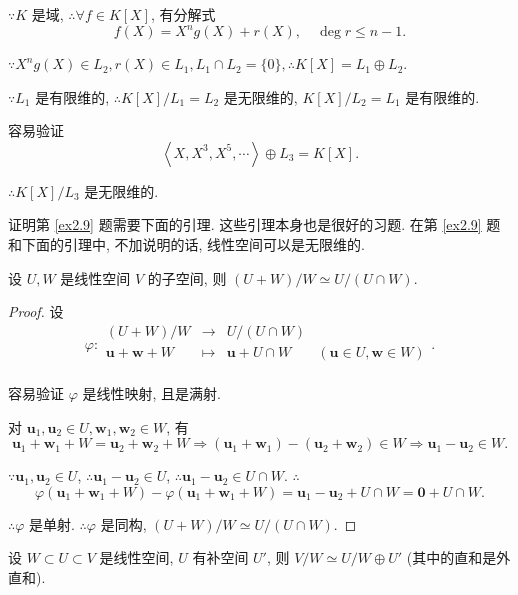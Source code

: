 \documentclass[color=black,device=normal,lang=cn,mode=geye]{elegantnote}
\begin{document}
\begin{solution}
    $\because K$ 是域, $\therefore\forall f\in K[X]$, 有分解式
    \[f(X)=X^ng(X)+r(X),\quad\deg r\leq n-1.\]

    $\because X^ng(X)\in L_2,r(X)\in L_1,L_1\cap L_2=\{0\},\therefore K[X]=L_1\oplus L_2$.

    $\because L_1$ 是有限维的, $\therefore K[X]/L_1=L_2$ 是无限维的, $K[X]/L_2=L_1$ 是有限维的.

    容易验证
    \[\left<X,X^3,X^5,\cdots\right>\oplus L_3=K[X].\]

    $\therefore K[X]/L_3$ 是无限维的.
\end{solution}

证明第 \ref{ex2.9} 题需要下面的引理. 这些引理本身也是很好的习题. 在第 \ref{ex2.9} 题和下面的引理中, 不加说明的话, 线性空间可以是无限维的.
\begin{lemma}\label{l4.1}
    设 $U,W$ 是线性空间 $V$ 的子空间, 则 $(U+W)/W\simeq U/(U\cap W)$.
\end{lemma}
\begin{proof}
    设
    \[\varphi:\begin{array}{rcll}
        (U+W)/W & \to & U/(U\cap W) \\
        \boldsymbol{u}+\boldsymbol{w}+W & \mapsto & \boldsymbol{u}+U\cap W & (\boldsymbol{u}\in U,\boldsymbol{w}\in W) \\
    \end{array}.\]

    容易验证 $\varphi$ 是线性映射, 且是满射.

    对 $\boldsymbol{u}_1,\boldsymbol{u}_2\in U,\boldsymbol{w}_1,\boldsymbol{w}_2\in W$, 有
    \[\boldsymbol{u}_1+\boldsymbol{w}_1+W=\boldsymbol{u}_2+\boldsymbol{w}_2+W\Rightarrow(\boldsymbol{u}_1+\boldsymbol{w}_1)-(\boldsymbol{u}_2+\boldsymbol{w}_2)\in W\Rightarrow\boldsymbol{u}_1-\boldsymbol{u}_2\in W.\]

    $\because\boldsymbol{u}_1,\boldsymbol{u}_2\in U$, $\therefore\boldsymbol{u}_1-\boldsymbol{u}_2\in U$, $\therefore\boldsymbol{u}_1-\boldsymbol{u}_2\in U\cap W$. $\therefore$
    \[\varphi(\boldsymbol{u}_1+\boldsymbol{w}_1+W)-\varphi(\boldsymbol{u}_1+\boldsymbol{w}_1+W)=\boldsymbol{u}_1-\boldsymbol{u}_2+U\cap W=\boldsymbol{0}+U\cap W.\]

    $\therefore\varphi$ 是单射. $\therefore\varphi$ 是同构, $(U+W)/W\simeq U/(U\cap W)$.
\end{proof}
\begin{lemma}\label{l4.2}
    设 $W\subset U\subset V$ 是线性空间, $U$ 有补空间 $U'$, 则 $V/W\simeq U/W\oplus U'$ (其中的直和是外直和).
\end{lemma}
\end{document}
